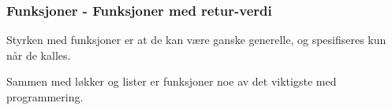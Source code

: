 \begin{frame}[fragile]
    \frametitle{Funksjoner - Funksjoner med retur-verdi}

    Styrken med funksjoner er at de kan være ganske generelle, og spesifiseres kun når de kalles. 
    
    Sammen med løkker og lister er funksjoner noe av det viktigste med programmering. 

\end{frame}
